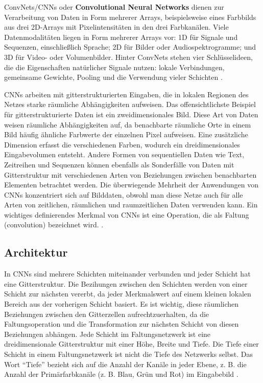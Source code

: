     ConvNets/CNNs oder \textbf{Convolutional Neural Networks} dienen zur Verarbeitung von Daten in Form mehrerer Arrays, beispielsweise eines Farbbilds aus drei 2D-Arrays mit Pixelintensitäten in den drei Farbkanälen. Viele Datenmodalitäten liegen in Form mehrerer Arrays vor: 1D für Signale und Sequenzen, einschließlich Sprache; 2D für Bilder oder Audiospektrogramme; und 3D für Video- oder Volumenbilder. Hinter ConvNets stehen vier Schlüsselideen, die die Eigenschaften natürlicher Signale nutzen: lokale Verbindungen, gemeinsame Gewichte, Pooling und die Verwendung vieler Schichten \cite*{Lecun2015}.


    CNNs arbeiten mit gitterstrukturierten Eingaben, die in lokalen Regionen des Netzes starke räumliche Abhängigkeiten aufweisen. Das offensichtlichste Beispiel für gitterstrukturierte Daten ist ein zweidimensionales Bild. Diese Art von Daten weisen räumliche Abhängigkeiten auf, da benachbarte räumliche Orte in einem Bild häufig ähnliche Farbwerte der einzelnen Pixel aufweisen. Eine zusätzliche Dimension erfasst die verschiedenen Farben, wodurch ein dreidimensionales Eingabevolumen entsteht. Andere Formen von sequentiellen Daten wie Text, Zeitreihen und Sequenzen können ebenfalls als Sonderfälle von Daten mit Gitterstruktur mit verschiedenen Arten von Beziehungen zwischen benachbarten Elementen betrachtet werden. Die überwiegende Mehrheit der Anwendungen von CNNs konzentriert sich auf Bilddaten, obwohl man diese Netze auch für alle Arten von zeitlichen, räumlichen und raumzeitlichen Daten verwenden kann. Ein wichtiges definierendes Merkmal von CNNs ist eine Operation, die als Faltung (convolution) bezeichnet wird. \cite*[315-316]{Aggarwal2018}.




    \subsection{Architektur}
    In CNNs sind mehrere Schichten miteinander verbunden und jeder Schicht hat eine Gitterstruktur. Die Bezihungen zwischen den Schichten werden von einer Schicht zur nächsten vererbt, da jeder Merkmalswert auf einem kleinen lokalen Bereich aus der vorherigen Schicht basiert. Es ist wichtig, diese räumlichen Beziehungen zwischen den Gitterzellen aufrechtzuerhalten, da die Faltungsoperation und die Transformation zur nächsten Schicht von diesen Beziehungen abhängen. Jede Schicht im Faltungsnetzwerk ist eine dreidimensionale Gitterstruktur mit einer Höhe, Breite und Tiefe. Die Tiefe einer Schicht in einem Faltungsnetzwerk ist nicht die Tiefe des Netzwerks selbst. Das Wort \enquote{Tiefe} bezieht sich auf die Anzahl der Kanäle in jeder Ebene, z. B. die Anzahl der Primärfarbkanäle (z. B. Blau, Grün und Rot) im Eingabebild \cite*[318]{Aggarwal2018}.

